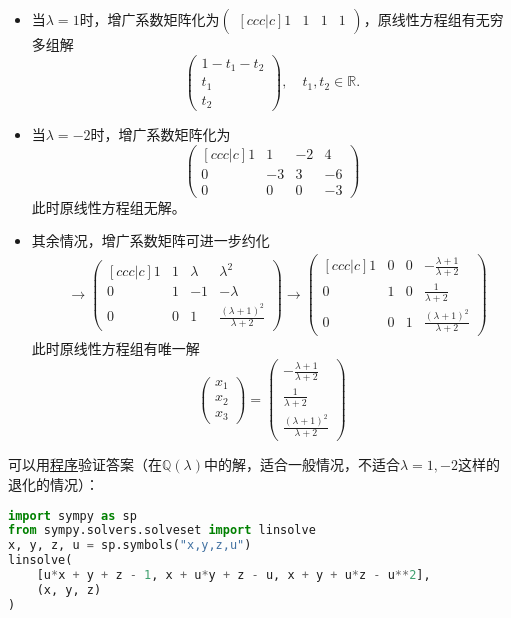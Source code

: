 \begin{itemize}
\item 当$\lambda = 1$时，增广系数矩阵化为$\begin{pmatrix}[ccc|c] 1 & 1 & 1 & 1 \end{pmatrix}$，原线性方程组有无穷多组解
$$\begin{pmatrix}
  1 - t_1 - t_2 \\ t_1 \\ t_2
\end{pmatrix}, \quad t_1, t_2 \in \mathbb{R}.$$
\item 当$\lambda = -2$时，增广系数矩阵化为
$$\begin{pmatrix}[ccc|c] 1 & 1 & -2 & 4 \\ 0 & -3 & 3 & -6 \\ 0 & 0 & 0 & -3 \end{pmatrix}$$
此时原线性方程组无解。
\item 其余情况，增广系数矩阵可进一步约化
\begin{align*}
& \to
\begin{pmatrix}[ccc|c]
  1 & 1 & \lambda & \lambda^2 \\
  0 & 1 & -1 & -\lambda \\
  0 & 0 & 1 & \frac{(\lambda+1)^2}{\lambda+2}
\end{pmatrix} \to
\begin{pmatrix}[ccc|c]
  1 & 0 & 0 & -\frac{\lambda+1}{\lambda+2} \\
  0 & 1 & 0 & \frac{1}{\lambda+2} \\
  0 & 0 & 1 & \frac{(\lambda+1)^2}{\lambda+2}
\end{pmatrix}
\end{align*}
此时原线性方程组有唯一解
$$
\begin{pmatrix} x_1 \\ x_2 \\ x_3 \end{pmatrix} = \begin{pmatrix} -\frac{\lambda+1}{\lambda+2} \\ \frac{1}{\lambda+2} \\ \frac{(\lambda+1)^2}{\lambda+2} \end{pmatrix}
$$
\end{itemize}

可以用\href{https://gitee.com/wenh06/buaa-advanced-algebra-2021/blob/master/notebooks/class-1.ipynb}{程序}验证答案（在$\mathbb{Q}(\lambda)$中的解，适合一般情况，不适合$\lambda = 1,-2$这样的退化的情况）：
\begin{center}
\begin{lstlisting}[language=Python]
import sympy as sp
from sympy.solvers.solveset import linsolve
x, y, z, u = sp.symbols("x,y,z,u")
linsolve(
    [u*x + y + z - 1, x + u*y + z - u, x + y + u*z - u**2],
    (x, y, z)
)
\end{lstlisting}
\end{center}

